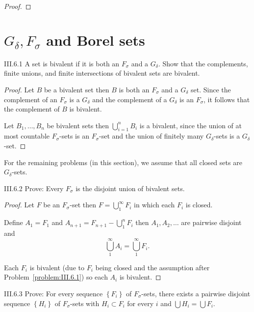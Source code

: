 \begin{proof}
\end{proof}

\section{\( G_{\delta}, F_{\sigma} \) and Borel sets}

\begin{problem}{III.6.1}\label{problem:III.6.1}
A set is bivalent if it is both an \(F_{\sigma}\) and a \(G_{\delta}\). Show that the complements, finite unions, and finite intersections of bivalent sets are bivalent.
\end{problem}

\begin{proof}
    Let \(B\) be a bivalent set then \(B\) is both an \(F_{\sigma}\) and a \(G_{\delta}\) set. Since the complement of an \(F_{\sigma}\) is a \(G_{\delta}\) and the complement of a \(G_{\delta}\) is an \(F_{\sigma}\), it follows that the complement of \(B\) is bivalent.

    Let \( B_{1}, \ldots, B_{n} \) be bivalent sets then \( \bigcup^{n}_{i=1}B_{i} \) is a bivalent, since the union of at most countable \(F_{\sigma}\)-sets is an \(F_{\sigma}\)-set and the union of finitely many \(G_{\delta}\)-sets is a \(G_{\delta}\)-set.
\end{proof}

For the remaining problems (in this section), we assume that all closed sets are \(G_{\delta}\)-sets.

\begin{problem}{III.6.2}\label{problem:III.6.2}
Prove: Every \(F_{\sigma}\) is the disjoint union of bivalent sets.
\end{problem}

\begin{proof}
    Let \(F\) be an \(F_{\sigma}\)-set then \( F = \bigcup^{\infty}_{1} F_{i} \) in which each \(F_{i}\) is closed.

    Define \(A_{1} = F_{1}\) and \(A_{n+1} = F_{n+1} - \bigcup^{n}_{1} F_{i}\) then \( A_{1}, A_{2}, \ldots \) are pairwise disjoint and
    \[
        \bigcup^{\infty}_{1} A_{i} = \bigcup^{\infty}_{1} F_{i}.
    \]

    Each \(F_{i}\) is bivalent (due to \(F_{i}\) being closed and the assumption after Problem~\ref{problem:III.6.1}) so each \(A_{i}\) is bivalent.
\end{proof}

\begin{problem}{III.6.3}\label{problem:III.6.3}
Prove: For every sequence \( \left\{ F_{i} \right\} \) of \(F_{\sigma}\)-sets, there exists a pairwise disjoint sequence \( \left\{ H_{i} \right\} \) of \(F_{\sigma}\)-sets with \(H_{i} \subset F_{i}\) for every \(i\) and \( \bigcup H_{i} = \bigcup F_{i} \).
\end{problem}

